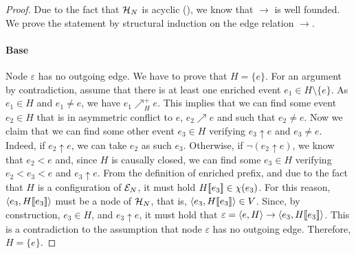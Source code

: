 \begin{proof}
Due to the fact that $\mathcal{H}_{N}$ is acyclic (), we know that $\to$
is well founded.  We prove the statement by structural induction on the edge
relation $\to$.

\paragraph{Base} Node $\varepsilon$ has no outgoing edge.  We have to
prove that $H = \{e\}$.  For an argument by contradiction, assume that there is
at least one enriched event $e_1 \in H \setminus \{e\}$.  As $e_1 \in H$ and
$e_1 \ne e$, we have $e_1 \nearrow^+_H e$.  This implies that we can find some
event $e_2 \in H$ that is in asymmetric conflict to $e$, $e_2 \nearrow e$ and
such that $e_2 \ne e$.  Now we claim that we can find some other event $e_3 \in
H$ verifying $e_3 \uparrow e$ and $e_3 \ne e$.  Indeed, if $e_2 \uparrow e$, we
can take $e_2$ as such $e_3$.  Otherwise, if $\lnot (e_2 \uparrow e)$, we know
that $e_2 < e$ and, since $H$ is causally closed, we can find some $e_3 \in H$
verifying $e_2 < e_3 < e$ and $e_3 \uparrow e$.  From the definition of
enriched prefix, and due to the fact that $H$ is a configuration of $\mathcal{E}_{N}$,
it must hold $H [\![ e_3]\!] \in \chi (e_3)$.  For this reason, $\langle e_3, H
[\![ e_3]\!] \rangle$ must be a node of $\mathcal{H}_{N}$, that is, $\langle e_3, H
[\![ e_3]\!] \rangle \in V$.  Since, by construction, $e_3 \in H$, and $e_3
\uparrow e$, it must hold that $\varepsilon = \langle e, H \rangle \to \langle
e_3, H [\![ e_3]\!] \rangle$.  This is a contradiction to the assumption that node
$\varepsilon$ has no outgoing edge.  Therefore, $H = \{e\}$.


\end{proof}
